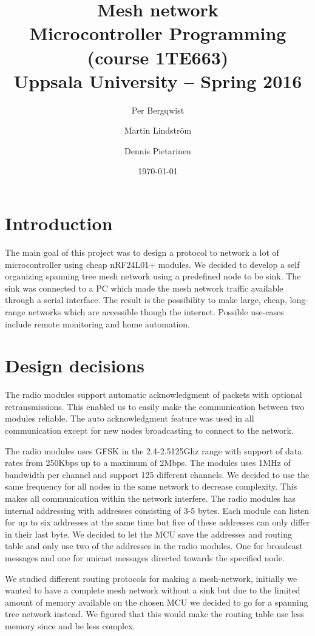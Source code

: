 \documentclass[a4paper,11pt]{article}
\title{\textbf{Mesh network}\\
  Microcontroller Programming (course 1TE663)\\
  Uppsala University -- Spring 2016}
\author{Per Bergqwist \and Martin Lindstr\"om \and Dennis Pietarinen}
\date{\today}
\begin{document}
\maketitle

\tableofcontents

\newpage

\section{Introduction}
The main goal of this project was to design a protocol to network a
lot of microcontroller using cheap nRF24L01+ modules.  We decided to
develop a self organizing spanning tree mesh network using a
predefined node to be sink.  The sink was connected to a PC which made
the mesh network traffic available through a serial interface. The
result is the possibility to make large, cheap, long-range networks
which are accessible though the internet. Possible use-cases include
remote monitoring and home automation.

\section{Design decisions}
The radio modules support automatic acknowledgment of packets with
optional retransmissions. This enabled us to easily make the
communication between two modules reliable. The auto acknowledgment
feature was used in all communication except for new nodes
broadcasting to connect to the network\cite{nrfDS}.

The radio modules uses GFSK in the 2.4-2.5125Ghz range with support of
data rates from 250Kbps up to a maximum of 2Mbps. The modules uses
1MHz of bandwidth per channel and support 125 different channels. We
decided to use the same frequency for all nodes in the same network to
decrease complexity. This makes all communication within the network
interfere. The radio modules has internal addressing with addresses
consisting of 3-5 bytes. Each module can listen for up to six
addresses at the same time but five of these addresses can only differ
in their last byte. We decided to let the MCU save the addresses and
routing table and only use two of the addresses in the radio
modules. One for broadcast messages and one for unicast messages
directed towards the specified node.

We studied different routing protocols for making a mesh-network,
initially we wanted to have a complete mesh network without a sink but
due to the limited amount of memory available on the chosen MCU we
decided to go for a spanning tree network instead. We figured that
this would make the routing table use less memory since and be less
complex.
\end{document}
